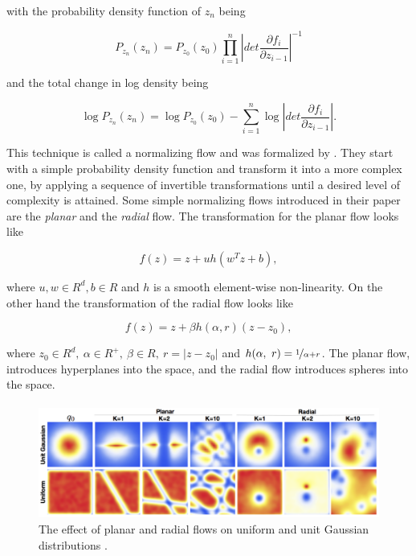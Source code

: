 with the probability density function of $ z_n $ being

\begin{equation}
    \label{equation:cnf:nf:total_change_density}
    P_{z_n}(z_n) = P_{z_0}(z_0) \prod_{i=1}^n \left | det \frac{\partial f_i}{\partial z_{i-1}} \right |^{-1}
\end{equation}

and the total change in log density being

\begin{equation}
    \label{equation:cnf:nf:total_change_log_density}
    \log P_{z_n}(z_n) = \log P_{z_0}(z_0) - \sum_{i=1}^n \log \left | det \frac{\partial f_i}{\partial z_{i-1}} \right |.
\end{equation}

This technique is called a normalizing flow and was formalized by \citet{rezende2015variational}. They start with a simple probability density function and transform it into a more complex one, by applying a sequence of invertible transformations until a desired level of complexity is attained. Some simple normalizing flows introduced in their paper \citep{rezende2015variational} are the \emph{planar} and the \emph{radial} flow. The transformation for the planar flow looks like

\begin{displaymath}
    f(z) = z + uh(w^Tz + b),
\end{displaymath}

where $ u, w \in R^d, b \in R $ and $ h $ is a smooth element-wise non-linearity. On the other hand the transformation of the radial flow looks like

\begin{displaymath}
    f(z) = z + \beta h(\alpha, r)(z - z_0),
\end{displaymath}

where $ z_0 \in R^d, \ \alpha \in R^+, \ \beta \in R, \ r = \lvert z - z_0 \rvert $ and $ h(\alpha, \ r) = \nicefrac{1}{\alpha + r} $. The planar flow, introduces hyperplanes into the space, and the radial flow introduces spheres into the space.

\begin{figure}[ht]
      \centering
      \includegraphics[width=\columnwidth]{figures/planar_radial_flows.png}
      \caption{The effect of planar and radial flows on uniform and unit Gaussian distributions \citep{rezende2015variational}.}
      \label{figure:cnf:planar_radial_flows}
\end{figure}

